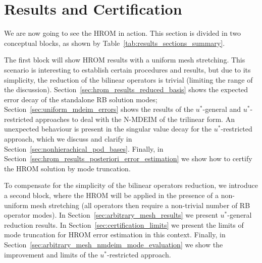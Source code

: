 \documentclass[../../thesis.tex]{subfiles}
\begin{document}
\section{Results and Certification}
\label{sec:results_and_certification}
We are now going to see the HROM in action.
This section is divided in two conceptual blocks, 
as shown by Table~\ref{tab:results_sections_summary}.

The first block will show HROM results with a uniform mesh stretching.
This scenario is interesting to establish certain procedures and results,
but due to its simplicity, the reduction of the bilinear operators is trivial
(limiting the range of the discussion).
Section~\ref{sec:hrom_results_reduced_basis} shows 
the expected error decay of the standalone RB solution modes;
Section~\ref{sec:uniform_mdeim_errors} shows the results 
of the $u^{*}$-general and $u^{*}$-restricted approaches 
to deal with the N-MDEIM of the trilinear form.
An unexpected behaviour is present in the singular value decay 
for the $u^{*}$-restricted approach, 
which we discuss and clarify in Section~\ref{sec:nonhierachical_pod_bases}.
Finally, in Section~\ref{sec:hrom_results_posteriori_error_estimation} we show 
how to certify the HROM solution by mode truncation.

To compensate for the simplicity of the bilinear operators reduction, 
we introduce a second block,
where the HROM will be applied in the presence of a non-uniform mesh stretching
(all operators then require a non-trivial number of RB operator modes). 
In Section~\ref{sec:arbitrary_mesh_results} 
we present $u^{*}$-general reduction results.
In Section~\ref{sec:certification_limits} 
we present the limits of mode truncation
for HROM error estimation in this context.
Finally, in Section~\ref{sec:arbitrary_mesh_nmdeim_mode_evaluation} we show
the improvement and limits of the $u^{*}$-restricted approach.
\end{document}
